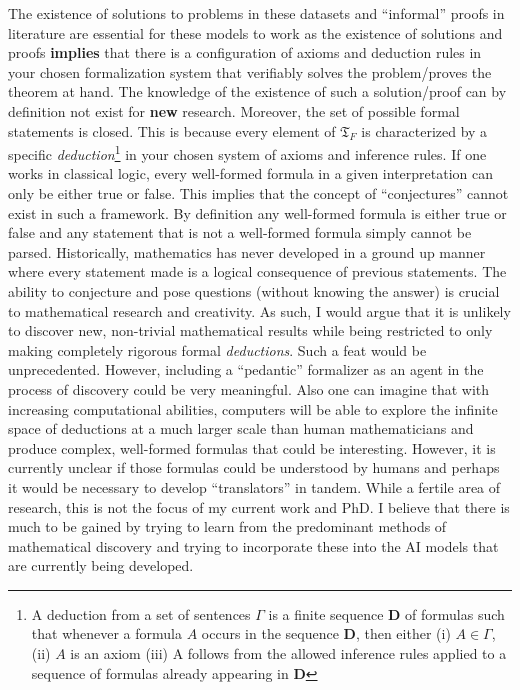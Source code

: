 The existence of solutions to problems in these datasets and ``informal'' proofs in literature are essential for these models to work as the existence of solutions and proofs \textbf{implies} that there is a configuration of axioms and deduction rules in your chosen formalization system that verifiably solves the problem/proves the theorem at hand.
The knowledge of the existence of such a solution/proof can by definition not exist for \textbf{new} research. Moreover, the set of possible formal statements is closed. This is because every element of $\mathfrak{T}_F$ is characterized by a specific \textit{deduction}\footnote[1]{A deduction from a set of sentences $\Gamma$ is a finite sequence \textbf{D} of formulas such that whenever a formula $A$ occurs in the sequence \textbf{D}, then either (i) $A\in\Gamma$, (ii) $A$ is an axiom (iii) A follows from the allowed inference rules applied to a sequence of formulas already appearing in \textbf{D}} in your chosen system of axioms and inference rules. 
If one works in classical logic, every well-formed formula in a given interpretation can only be either true or false. This implies that the concept of ``conjectures'' cannot exist in such a framework. By definition any well-formed formula is either true or false
and any statement that is not a well-formed formula simply cannot be parsed. Historically, mathematics has never developed in a ground up manner where every statement made is a logical consequence of previous statements. The ability to conjecture and pose questions (without knowing the answer) is crucial to mathematical research and creativity. As such, I would argue that it is unlikely to discover new, non-trivial mathematical results while being restricted to only making completely rigorous formal \textit{deductions}. Such a feat would be unprecedented.
However, including a ``pedantic'' formalizer as an agent in the process of discovery could be very meaningful. Also one can imagine that with increasing computational abilities, computers will be able to explore the infinite space of deductions at a much larger scale than human mathematicians and produce
complex, well-formed formulas that could be interesting. However, it is currently unclear if those formulas could be understood by humans and perhaps it would be necessary to develop ``translators'' in tandem. While a fertile area of research, this is not the focus of my current work and PhD. I believe that there is much to be gained by trying to learn from the predominant methods of mathematical discovery and trying to incorporate these into the AI models that are currently being developed.

